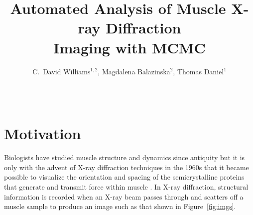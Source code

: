 \documentclass{sig-alternate}
\newcommand{\note}[2]{
    \textbf{\textcolor{#1}{#2}}
}
\newcommand{\dave}[1]{\note{PineGreen}{Dave: #1}}
\begin{document}
\title{Automated Analysis of Muscle X-ray Diffraction \\ Imaging with MCMC}
\author{C.\ David Williams$^{1,2}$,  Magdalena Balazinska$^2$, Thomas Daniel$^1$ \\
\\
 \\
}
\maketitle





\sloppy






\section{Motivation}
\label{sec:motivation}


Biologists have studied muscle structure and dynamics since antiquity
but it is only with the advent of X-ray diffraction techniques in the
1960s that it became possible to visualize the orientation and spacing
of the semicrystalline proteins that generate and transmit force
within muscle \cite{Millman1998}. In X-ray diffraction, structural
information is recorded when an X-ray beam passes through and scatters
off a muscle sample to produce an image such as that shown in
Figure~\ref{fig:imgs}.
\end{document}
